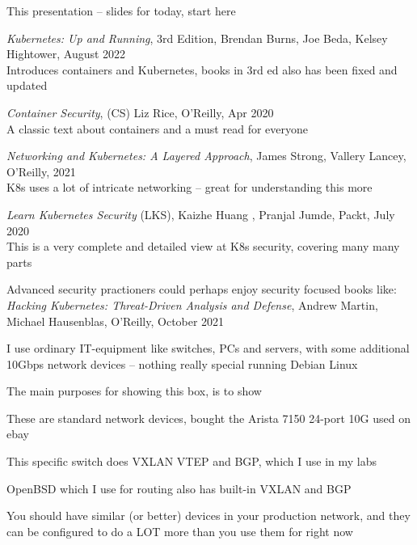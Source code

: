 \documentclass[Screen16to9,17pt]{foils}
\begin{document}

\begin{list2}
\item This presentation -- slides for today, start here
\item \emph{Kubernetes: Up and Running}, 3rd Edition, Brendan Burns, Joe Beda, Kelsey Hightower,
August 2022\\
Introduces containers and Kubernetes, books in 3rd ed also has been fixed and updated
\item \emph{Container Security}, (CS) Liz Rice, O'Reilly, Apr 2020\\
A classic text about containers and a must read for everyone
\item \emph{Networking and Kubernetes: A Layered Approach}, James Strong, Vallery Lancey, O'Reilly, 2021\\
K8s uses a lot of intricate networking -- great for understanding this more
\item \emph{Learn Kubernetes Security} (LKS), Kaizhe Huang , Pranjal Jumde, Packt, July 2020\\
This is a very complete and detailed view at K8s security, covering many many parts
\item Advanced security practioners could perhaps enjoy security focused books like:\\
\emph{Hacking Kubernetes: Threat-Driven Analysis and Defense}, Andrew Martin, Michael Hausenblas, O'Reilly, October 2021
\end{list2}



I use ordinary IT-equipment like switches, PCs and servers, with some additional 10Gbps network devices -- nothing really special running Debian Linux

The main purposes for showing this box, is to show
\begin{list2}
\item These are standard network devices, bought the Arista 7150 24-port 10G used on ebay
\item This specific switch does VXLAN VTEP and BGP, which I use in my labs
\item OpenBSD which I use for routing also has built-in VXLAN and BGP
\end{list2}

You should have similar (or better) devices in your production network, and they can be
configured to do a LOT more than you use them for right now
\end{document}
